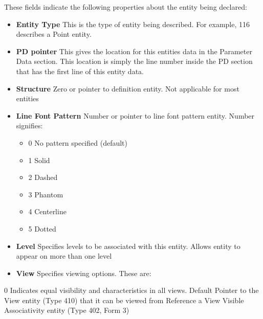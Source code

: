 These fields indicate the following properties about the entity being
declared:

\begin{itemize}
\itemsep1pt\parskip0pt
\item
  \textbf{Entity Type} This is the type of entity being described. For
  example, 116 describes a Point entity.
\item
  \textbf{PD pointer} This gives the location for this entities data in
  the Parameter Data section. This location is simply the line number
  inside the PD section that has the first line of this entity data.
\item
  \textbf{Structure} Zero or pointer to definition entity. Not
  applicable for most entities
\item
  \textbf{Line Font Pattern} Number or pointer to line font pattern
  entity. Number signifies:

  \begin{itemize}
  \itemsep1pt\parskip0pt
  \item
    0 No pattern specified (default)
  \item
    1 Solid
  \item
    2 Dashed
  \item
    3 Phantom
  \item
    4 Centerline
  \item
    5 Dotted
  \end{itemize}
\item
  \textbf{Level} Specifies levels to be associated with this entity.
  Allows entity to appear on more than one level
\item
  \textbf{View} Specifies viewing options. These are:
\end{itemize}

0 Indicates equal visibility and characteristics in all views. Default
Pointer to the View entity (Type 410) that it can be viewed from
Reference a View Visible Associativity entity (Type 402, Form 3)

